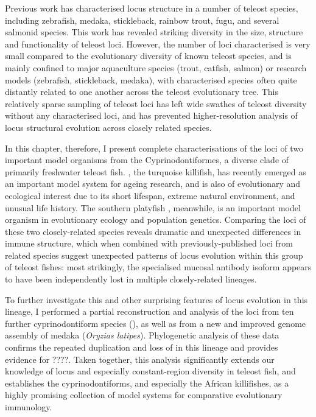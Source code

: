 Previous work has characterised \igh{} locus structure in a number of teleost species, including zebrafish, medaka, stickleback, rainbow trout, fugu, and several salmonid species. This work has revealed striking diversity in the size, structure and functionality of teleost \igh{} loci. However, the number of loci characterised is very small compared to the evolutionary diversity of known teleost species, and is mainly confined to major aquaculture species (trout, catfish, salmon) or research models (zebrafish, stickleback, medaka), with characterised species often quite distantly related to one another across the teleost evolutionary tree. This relatively sparse sampling of teleost \igh{} loci has left wide swathes of teleost diversity without any characterised \igh{} loci, and has prevented higher-resolution analysis of locus structural evolution across closely related species.

In this chapter, therefore, I present complete characterisations of the \igh{} loci of two important model organisms from the Cyprinodontiformes, a diverse clade of primarily freshwater teleost fish. \nfu, the turquoise killifish, has recently emerged as an important model system for ageing research, %
and is also of evolutionary and ecological interest due to its short lifespan, extreme natural environment, and unusual life history. The southern platyfish \xma, meanwhile, is an important model organism in evolutionary ecology and population genetics. %
Comparing the \igh{} loci of these two closely-related species reveals dramatic and unexpected differences in immune structure, which when combined with previously-published loci from related species suggest unexpected patterns of locus evolution within this group of teleost fishes: most strikingly, the specialised mucosal antibody isoform  appears to have been independently lost in multiple closely-related lineages. 

To further investigate this and other surprising features of \igh{} locus evolution in this lineage, I performed a partial reconstruction and analysis of the \igh{} loci from ten further cyprinodontiform species (), as well as from a new and improved genome assembly of medaka (\textit{Oryzias latipes}). Phylogenetic analysis of these data confirms the repeated duplication and loss of  in this lineage and provides evidence for ????. %
Taken together, this analysis significantly extends our knowledge of \igh{} locus and especially constant-region diversity in teleost fish, and establishes the cyprinodontiforms, and especially the African killifishes, as a highly promising collection of model systems for comparative evolutionary immunology.

